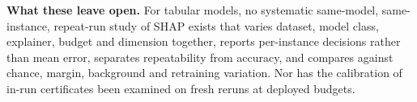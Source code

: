 \textbf{What these leave open.}
For tabular models, no systematic same-model, same-instance, repeat-run study of SHAP exists that varies dataset, model class, explainer, budget and dimension together, reports per-instance decisions rather than mean error, separates repeatability from accuracy, and compares against chance, margin, background and retraining variation. Nor has the calibration of in-run certificates been examined on fresh reruns at deployed budgets.
